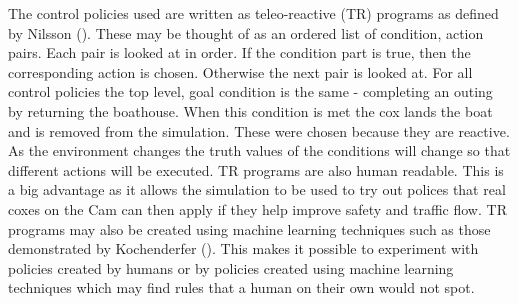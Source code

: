       The control policies used are written as teleo-reactive (TR) programs as defined by Nilsson (\cite{Nilsson1994}). These may be thought of as an ordered list of condition, action pairs. Each pair is looked at in order. If the condition part is true, then the corresponding action is chosen. Otherwise the next pair is looked at. For all control policies the top level, goal condition is the same - completing an outing by returning the boathouse. When this condition is met the cox lands the boat and is removed from the simulation. These were chosen because they are reactive. As the environment changes the truth values of the conditions will change so that different actions will be executed. TR programs are also human readable. This is a big advantage as it allows the simulation to be used to try out polices that real coxes on the Cam can then apply if they help improve safety and traffic flow. TR programs may also be created using machine learning techniques such as those demonstrated by Kochenderfer (\cite{Kochenderfer2003}). This makes it possible to experiment with policies created by humans or by policies created using machine learning techniques which may find rules that a human on their own would not spot.
